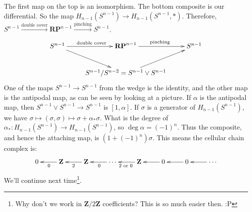 \documentclass{amsart}
\theoremstyle{theorem}
\theoremstyle{definition}
\newcommand{\Z}{\mathbf Z}
\begin{document}
The first map on the top is an isomorphism. The bottom composite is our differential. So the map $ H_{n-1}(S^{n-1})\to H_{n-1}(S^{n-1},\ast)$. Therefore, $S^{n-1}\xrightarrow{\text{double cover}}\mathbf{RP}^{n-1}\xrightarrow{\text{pinching}} S^{n-1}$.
\begin{equation*}
\xymatrix{S^{n-1}\ar[r]^{\text{double cover}}\ar[dr] & \mathbf{RP}^{n-1}\ar[r]^{\text{pinching}} & S^{n-1}\\
 & S^{n-1}/S^{n-2}=S^{n-1}\vee S^{n-1}\ar[ur]}
\end{equation*}
One of the maps $S^{n-1}\to S^{n-1}$ from the wedge is the identity, and the other map is the antipodal map, as can be seen by looking at a picture. If $\alpha$ is the antipodal map, then $S^{n-1}\vee S^{n-1}\to S^{n-1}$ is $[1,\alpha]$. If $\sigma$ is a generator of $ H_{n-1}(S^{n-1})$, we have $\sigma\mapsto (\sigma,\sigma)\mapsto \sigma+\alpha_\ast\sigma$. What is the degree of $\alpha_\ast: H_{n-1}(S^{n-1})\to H_{n-1}(S^{n-1})$, so $\deg\alpha=(-1)^n$. Thus the composite, and hence the attaching map, is $(1+(-1)^n)\sigma$. This means the cellular chain complex is:
\begin{equation*}
\xymatrix{0 & \Z\ar[l]^0 & \Z\ar[l]^2 & \cdots\ar[l]^0 & \Z\ar[l]^{2\text{ or }0} & 0\ar[l] & 0\ar[l] & \cdots\ar[l]}
\end{equation*}
We'll continue next time\footnote{Why don't we work in $\Z/2\Z$ coefficients? This is so much easier then. :P}.
\end{document}
